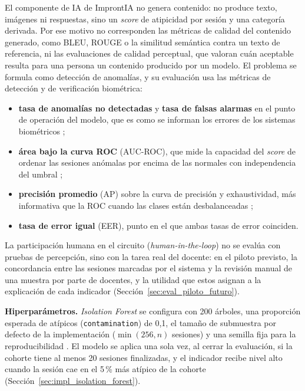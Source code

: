 El componente de IA de ImprontIA no genera contenido: no produce texto, imágenes ni respuestas, sino un \textit{score} de atipicidad por sesión y una categoría derivada. Por ese motivo no corresponden las métricas de calidad del contenido generado, como BLEU, ROUGE o la similitud semántica contra un texto de referencia, ni las evaluaciones de calidad perceptual, que valoran cuán aceptable resulta para una persona un contenido producido por un modelo. El problema se formula como detección de anomalías, y su evaluación usa las métricas de detección y de verificación biométrica:

\begin{itemize}
    \item \textbf{tasa de anomalías no detectadas} y \textbf{tasa de falsas alarmas} en el punto de operación del modelo, que es como se informan los errores de los sistemas biométricos \parencite{Jain2004, ISOIEC2021_19795};
    \item \textbf{área bajo la curva ROC} (AUC-ROC), que mide la capacidad del \textit{score} de ordenar las sesiones anómalas por encima de las normales con independencia del umbral \parencite{Fawcett2006};
    \item \textbf{precisión promedio} (AP) sobre la curva de precisión y exhaustividad, más informativa que la ROC cuando las clases están desbalanceadas \parencite{Saito2015};
    \item \textbf{tasa de error igual} (EER), punto en el que ambas tasas de error coinciden.
\end{itemize}

La participación humana en el circuito (\textit{human-in-the-loop}) no se evalúa con pruebas de percepción, sino con la tarea real del docente: en el piloto previsto, la concordancia entre las sesiones marcadas por el sistema y la revisión manual de una muestra por parte de docentes, y la utilidad que estos asignan a la explicación de cada indicador (Sección~\ref{sec:eval_piloto_futuro}).

\textbf{Hiperparámetros.} \textit{Isolation Forest} se configura con 200 árboles, una proporción esperada de atípicos (\texttt{contamination}) de 0{,}1, el tamaño de submuestra por defecto de la implementación ($\min(256, n)$ sesiones) y una semilla fija para la reproducibilidad \parencite{ScikitLearnIF}. El modelo se aplica una sola vez, al cerrar la evaluación, si la cohorte tiene al menos 20 sesiones finalizadas, y el indicador recibe nivel alto cuando la sesión cae en el 5\,\% más atípico de la cohorte (Sección~\ref{sec:impl_isolation_forest}).

